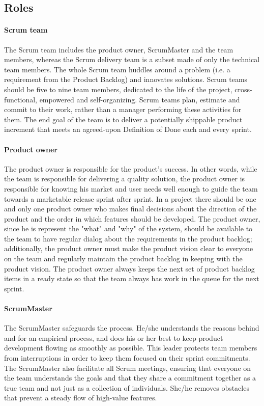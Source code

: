 \subsection{Roles}
\paragraph{Scrum team} The Scrum team includes the product owner, ScrumMaster and the team members, whereas the Scrum delivery team is a subset made of only the technical team members. The whole Scrum team huddles around a problem (i.e. a requirement from the Product Backlog) and innovates solutions. Scrum teams should be five to nine team members, dedicated to the life of the project, cross-functional, empowered and self-organizing. Scrum teams plan, estimate and commit to their work, rather than a manager performing these activities for them. The end goal of the team is to deliver a potentially shippable product increment that meets an agreed-upon Definition of Done each and every sprint.
\paragraph{Product owner} The product owner is responsible for the product's success. In other words, while the team is responsible for delivering a quality solution, the product owner is responsible for knowing his market and user needs well enough to guide the team towards a marketable release sprint after sprint. In a project there should be one and only one product owner who makes final decisions about the direction of the product and the order in which features should be developed. The product owner, since he is represent the "what" and "why" of the system, should be available to the team to have regular dialog about the requirements in the product backlog; additionally, the product owner must make the product vision clear to everyone on the team and regularly maintain the product backlog in keeping with the product vision. The product owner always keeps the next set of product backlog items in a ready state so that the team always has work in the queue for the next sprint.
\paragraph{ScrumMaster} The ScrumMaster safeguards the process. He/she understands the reasons behind and for an empirical process, and does his or her best to keep product development flowing as smoothly as possible. This leader protects team members from interruptions in order to keep them focused on their sprint commitments. The ScrumMaster also facilitate all Scrum meetings, ensuring that everyone on the team understands the goals and that they share a commitment together as a true team and not just as a collection of individuals. She/he removes obstacles that prevent a steady flow of high-value features.
